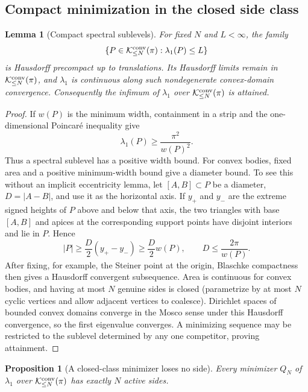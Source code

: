 \documentclass[11pt]{amsart}
\numberwithin{equation}{section}
\newtheorem{proposition}[theorem]{Proposition}
\newtheorem{lemma}[theorem]{Lemma}
\theoremstyle{definition}
\theoremstyle{remark}
\newcommand{\Kclass}{\mathcal K}
\begin{document}
\subsection{Compact minimization in the closed side class}

\begin{lemma}[Compact spectral sublevels]\label{G0:lem:compact}
For fixed $N$ and $L<\infty$, the family
\begin{equation}\label{G0:eq:sublevel}
 \{P\in\Kclass_{\le N}^{\rm conv}(\pi):
       \lambda_1(P)\le L\}
\end{equation}
is Hausdorff precompact up to translations.  Its Hausdorff limits remain
in $\Kclass_{\le N}^{\rm conv}(\pi)$, and $\lambda_1$ is continuous along
such nondegenerate convex-domain convergence.  Consequently the infimum
of $\lambda_1$ over $\Kclass_{\le N}^{\rm conv}(\pi)$ is attained.
\end{lemma}

\begin{proof}
If $w(P)$ is the minimum width, containment in a strip and the
one-dimensional Poincar\'e inequality give
\[
 \lambda_1(P)\ge\frac{\pi^2}{w(P)^2}.
\]
Thus a spectral sublevel has a positive width bound.  For convex bodies,
fixed area and a positive minimum-width bound give a diameter bound.  To
see this without an implicit eccentricity lemma, let $[A,B]\subset P$ be
a diameter, $D=|A-B|$, and use it as the horizontal axis.  If $y_+$ and
$y_-$ are the extreme signed heights of $P$ above and below that axis,
the two triangles with base $[A,B]$ and apices at the corresponding
support points have disjoint interiors and lie in $P$.  Hence
\[
 |P|\ge \frac D2(y_+-y_-)
      \ge \frac D2 w(P),
 \qquad
 D\le \frac{2\pi}{w(P)}.
\]
After fixing, for example, the Steiner point at the origin, Blaschke
compactness then gives a Hausdorff convergent
subsequence.  Area is continuous for convex bodies, and having at most
$N$ genuine sides is closed (parametrize by at most $N$ cyclic vertices
and allow adjacent vertices to coalesce).  Dirichlet spaces of bounded convex
domains converge in the Mosco sense under this Hausdorff convergence, so
the first eigenvalue converges.  A minimizing sequence may be restricted
to the sublevel determined by any one competitor, proving attainment.
\end{proof}

\begin{proposition}[A closed-class minimizer loses no side]
\label{G0:prop:no-loss}
Every minimizer $Q_N$ of $\lambda_1$ over
$\Kclass_{\le N}^{\rm conv}(\pi)$ has exactly $N$ active sides.
\end{proposition}
\end{document}
